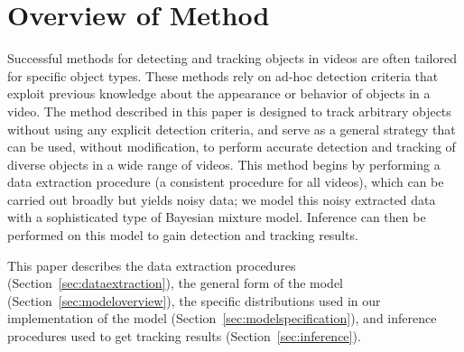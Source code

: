 \documentclass[twocolumn, final]{svjour3}
\begin{document}

\section{Overview of Method}
\label{sec:overviewofmethod}

Successful methods for detecting and tracking objects in videos are often tailored for specific object types. These methods rely on ad-hoc detection criteria that exploit previous knowledge about the appearance or behavior of objects in a video. The method described in this paper is designed to track arbitrary objects without using any explicit detection criteria, and serve as a general strategy that can be used, without modification, to perform accurate detection and tracking of diverse objects in a wide range of videos. This method begins by performing a data extraction procedure (a consistent procedure for all videos), which can be carried out broadly but yields noisy data; we model this noisy extracted data with a sophisticated type of Bayesian mixture model. Inference can then be performed on this model to gain detection and tracking results.

This paper describes the data extraction procedures (Section~\ref{sec:dataextraction}), the general form of the model (Section~\ref{sec:modeloverview}), the specific distributions used in our implementation of the model (Section~\ref{sec:modelspecification}), and inference procedures used to get tracking results (Section~\ref{sec:inference}).



\end{document}
